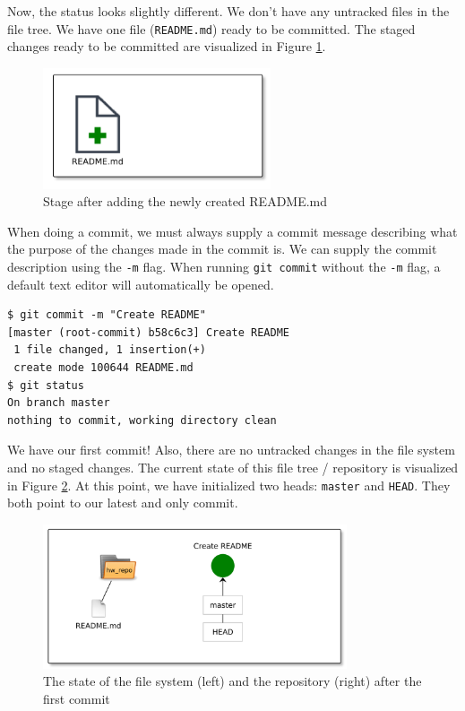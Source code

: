 \documentclass[../main/git_course_main.tex]{subfiles}
\begin{document}
Now, the status looks slightly different. We don't have any untracked files in the file tree. We have one file (\verb$README.md$) ready to be committed. The staged changes ready to be committed are visualized in Figure \ref{fig:first_stage}.

\begin{figure}[h!]
	\centering
	\includegraphics[width=0.6\textwidth
	]{../visualizations/chapter2/241_stage_created_readme.pdf}
	\caption{Stage after adding the newly created README.md}
	\label{fig:first_stage}
\end{figure}

When doing a commit, we must always supply a commit message describing what the purpose of the changes made in the
commit is. We can supply the commit description using the \verb$-m$ flag. 
When running \verb$git commit$ without the \verb$-m$ flag, a default text editor will automatically be opened.

\begin{codebox}
\begin{lstlisting}
$ git commit -m "Create README"
[master (root-commit) b58c6c3] Create README
 1 file changed, 1 insertion(+)
 create mode 100644 README.md
$ git status
On branch master
nothing to commit, working directory clean
\end{lstlisting}
\end{codebox}

We have our first commit! Also, there are no untracked changes in the file system and no staged changes.
The current state of this file tree / repository is visualized in Figure \ref{fig:first_commit}. At this point, we have initialized two heads: \verb$master$ and \verb$HEAD$. They both point to our latest and only commit.

\begin{figure}[h]
	\centering
	\includegraphics[width=0.8\textwidth]{../visualizations/chapter2/c24_repo_first_commit.pdf}
	\caption{The state of the file system (left) and the repository (right) after the first commit}
	\label{fig:first_commit}
\end{figure}
\end{document}
